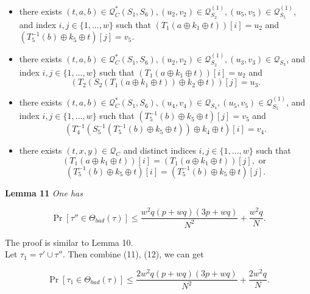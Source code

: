 \begin{itemize}
  \item[\feai]
  there exists $(t, a, b) \in \mathcal{Q}_{C}^{*}\left(S_{1}, S_{6}\right), \left(u_{2}, v_{2}\right) \in \mathcal{Q}_{S_{2}}^{(1)}, \left(u_{5}, v_{5}\right) \in \mathcal{Q}_{S_{5}}^{(1)}$, and index $i, j \in \{1, \ldots, w\}$ such that $(T_1\left(a \oplus k_{1} \oplus t\right))[i]=u_2$ and $(T_5^{-1}\left(b\right) \oplus k_{5} \oplus t)[j]=v_5$.
  \item[\feaii]
  there exists $(t, a, b) \in \mathcal{Q}_{C}^{*}\left(S_{1}, S_{6}\right), \left(u_{2}, v_{2}\right) \in \mathcal{Q}_{S_{2}}^{(1)}, \left(u_{3}, v_{3}\right) \in \mathcal{Q}_{S_{3}}$, and index $i, j \in \{1, \ldots, w\}$ such that $(T_1\left(a \oplus k_{1} \oplus t\right))[i]=u_2$ and 
  $$
  \left(T_{2}\left(S_{2}\left(T_1(a \oplus k_{1} \oplus t)\right) \oplus k_{2} \oplus t\right)\right)[j]=u_3.
  $$
  \item[\feaiii]
  there exists $(t, a, b) \in \mathcal{Q}_{C}^{*}\left(S_{1}, S_{6}\right), \left(u_{4}, v_{4}\right) \in \mathcal{Q}_{S_{4}}, \left(u_{5}, v_{5}\right) \in \mathcal{Q}_{S_{5}}^{(1)}$, and index $i, j \in \{1, \ldots, w\}$ such that $(T_5^{-1}\left(b\right) \oplus k_{5} \oplus t)[j]=v_5$ and 
  $$
  \left(T_{4}^{-1}\left(S_{5}^{-1}\left(T_5^{-1}(b) \oplus k_{5} \oplus t\right)\right) \oplus k_{4} \oplus t\right)[i]=v_4.
  $$
  \item[\feaiv]
  there exists $(t, x, y) \in \mathcal{Q}_{C}$ and distinct indices $i, j \in \{1, \ldots, w\}$ such that 
  $$(T_1\left(a \oplus k_{1} \oplus t\right))[i]=(T_1\left(a \oplus k_{1} \oplus t\right))[j], \text{ or }$$
  $$(T_5^{-1}\left(b\right) \oplus k_{5} \oplus t)[i]=(T_5^{-1}\left(b\right) \oplus k_{5} \oplus t)[j].$$
\end{itemize}

\noindent \textbf{Lemma 11} \emph{One has}

\begin{equation}
\operatorname{Pr}[\tau'' \in \Theta_{bad}(\tau)] \leq \frac{w^2 q (p+w q) (3 p +w q)}{N^{2}} + \frac{w^{2} q}{N}.
\end{equation}

\noindent The proof is similar to Lemma 10.\\

Let $\tau_{1} = \tau' \cup \tau''$. Then combine (11), (12), we can get

\begin{equation}
\operatorname{Pr}[\tau_{1} \in \Theta_{bad}(\tau)] \leq \frac{2w^2 q (p+w q) (3 p +w q)}{N^{2}} + \frac{2w^{2} q}{N}.
\end{equation}





